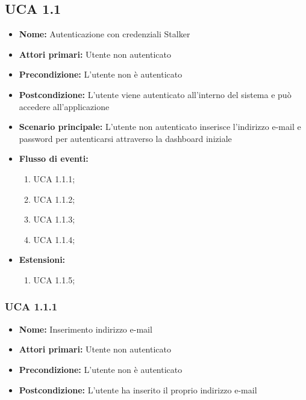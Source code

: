 \documentclass[a4paper, oneside, dvipsnames, table]{article} %
\begin{document}
\subsection{UCA 1.1}%
\begin{itemize}
\item \textbf{Nome:} Autenticazione con credenziali Stalker
\item \textbf{Attori primari:} Utente non autenticato
\item \textbf{Precondizione:} L’utente non è autenticato
\item \textbf{Postcondizione:} L’utente viene autenticato all’interno del sistema e può accedere all'applicazione
\item \textbf{Scenario principale:} L’utente non autenticato inserisce l’indirizzo e-mail e password per autenticarsi attraverso la dashboard iniziale%
\item \textbf{Flusso di eventi:} %
  \begin{enumerate}
        \item UCA 1.1.1;
        \item UCA 1.1.2;
        \item UCA 1.1.3;
        \item UCA 1.1.4;
    \end{enumerate}
\item \textbf{Estensioni:}
	\begin{enumerate}
		\item UCA 1.1.5;
	\end{enumerate}
\end{itemize}

\subsubsection{UCA 1.1.1}%
\begin{itemize}
\item \textbf{Nome:} Inserimento indirizzo e-mail
\item \textbf{Attori primari:}  Utente non autenticato
\item \textbf{Precondizione:}  L’utente non è autenticato
\item \textbf{Postcondizione:}  L’utente ha inserito il proprio indirizzo e-mail
\end{itemize}
\end{document}
